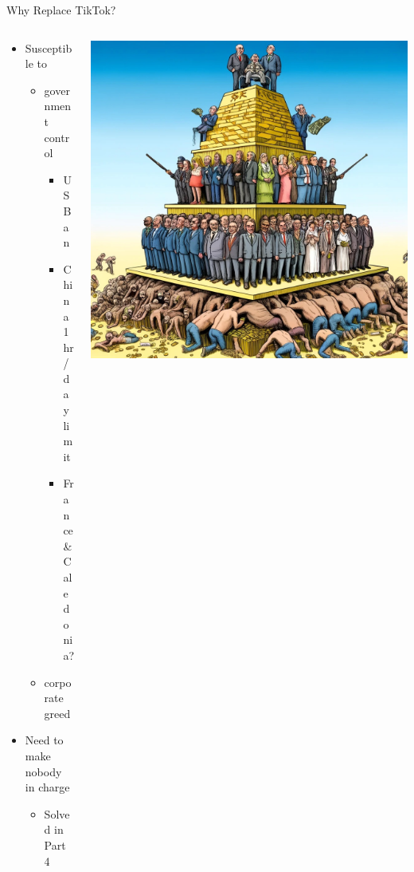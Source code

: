 \documentclass[aspectratio=169]{beamer}
\begin{document}
\begin{frame}{Why Replace TikTok?}
\begin{columns}[T]
    \begin{column}[T]{0.5\textwidth}
        \begin{itemize}
            \item Susceptible to 
            \begin{itemize}
                \item government control 
                \begin{itemize}
                    \item US Ban 
                    \item China 1hr/day limit
                    \item France \& Caledonia?
                \end{itemize}
                \item corporate greed
            \end{itemize}
            \item Need to make nobody in charge
            \begin{itemize}
                \item Solved in Part 4
            \end{itemize}
        \end{itemize}
    \end{column}
    \begin{column}{0.5\textwidth}
        \includegraphics[height=0.8\textheight]{imgs/why_replace/power_pyramid.jpeg}
    \end{column}
\end{columns}
\end{frame}
\end{document}
